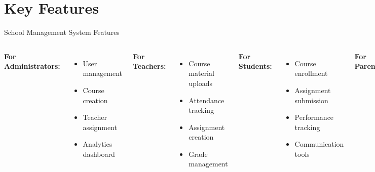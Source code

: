 \documentclass[aspectratio=169]{beamer}
\begin{document}
\section{Key Features}

\begin{frame}{School Management System Features}
    \begin{columns}
        \textbf{For Administrators:}
        \begin{itemize}
            \item User management
            \item Course creation
            \item Teacher assignment
            \item Analytics dashboard
        \end{itemize}
        \textbf{For Teachers:}
        \begin{itemize}
            \item Course material uploads
            \item Attendance tracking
            \item Assignment creation
            \item Grade management
        \end{itemize}
        \textbf{For Students:}
        \begin{itemize}
            \item Course enrollment
            \item Assignment submission
            \item Performance tracking
            \item Communication tools
        \end{itemize}
        \textbf{For Parents:}
        \begin{itemize}
            \item Child progress monitoring
            \item Teacher communication
            \item Attendance notifications
            \item Event calendar
        \end{itemize}
    \end{columns}
\end{frame}
\end{document}
